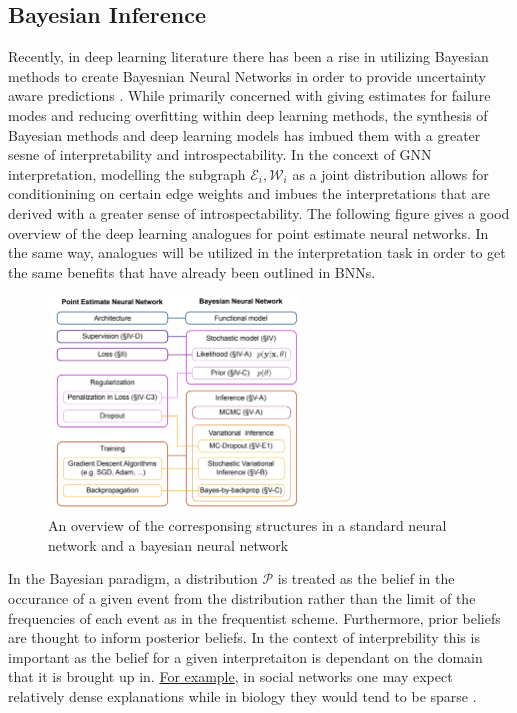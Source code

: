 \subsection{Bayesian Inference}
Recently, in deep learning literature there has been a rise in utilizing Bayesian methods to create Bayesnian Neural Networks in order to provide uncertainty aware predictions \cite{jospin_hands-bayesian_2022}. While primarily concerned with giving estimates for failure modes and reducing overfitting within deep learning methods, the synthesis of Bayesian methods and deep learning models has imbued them with a greater sesne of interpretability and introspectability. In the concext of GNN interpretation, modelling the subgraph $\mathcal{E}_i, \mathcal{W}_i$ as a joint distribution allows for conditionining on certain edge weights and imbues the interpretations that are derived with a greater sense of introspectability. The following figure gives a good overview of the deep learning analogues for point estimate neural networks. In the same way, analogues will be utilized in the interpretation task in order to get the same benefits that have already been outlined in BNNs.
\begin{figure}[t]
  \centering
  \includegraphics[width=0.6\textwidth]{images/bnn.jpeg}
  \caption{An overview of the corresponsing structures in a standard neural network and a bayesian neural network}
  \label{fig:bnn_overview}
\end{figure}
In the Bayesian paradigm, a distribution $\mathcal{P}$ is treated as the belief in the occurance of a given event from the distribution rather than the limit of the frequencies of each event as in the frequentist scheme. Furthermore, prior beliefs are thought to inform posterior beliefs. In the context of interprebility this is important as the belief for a given interpretaiton is dependant on the domain that it is brought up in. \hyperref[fig:prior]{For example}, in social networks one may expect relatively dense explanations while in biology they would tend to be sparse \cite{cho_friendship_2011} \cite{petralia_new_2016}.
